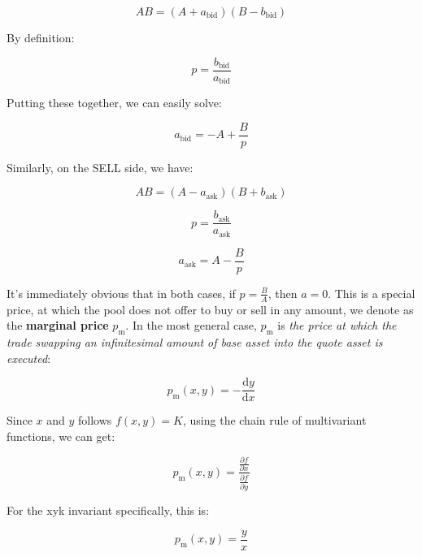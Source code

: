 \documentclass{article}
\begin{document}
\begin{equation}
  A B = (A + a_{\mathrm{bid}}) (B - b_{\mathrm{bid}})
\end{equation}

By definition:

\begin{equation}
  p = \frac{b_{\mathrm{bid}}}{a_{\mathrm{bid}}}
\end{equation}

Putting these together, we can easily solve:

\begin{equation}
  a_{\mathrm{bid}} = -A + \frac{B}{p}
\end{equation}

Similarly, on the SELL side, we have:

\begin{equation}
  A B = (A - a_{\mathrm{ask}}) (B + b_{\mathrm{ask}})
\end{equation}

\begin{equation}
  p = \frac{b_{\mathrm{ask}}}{a_{\mathrm{ask}}}
\end{equation}

\begin{equation}
  a_{\mathrm{ask}} = A - \frac{B}{p}
\end{equation}

It's immediately obvious that in both cases, if $p = \frac{B}{A}$, then $a = 0$. This is a special price, at which the pool does not offer to buy or sell in any amount, we denote as the \textbf{marginal price} $p_{\mathrm{m}}$. In the most general case, $p_{\mathrm{m}}$ is \textit{the price at which the trade swapping an infinitesimal amount of base asset into the quote asset is executed}:

\begin{equation}
  p_{\mathrm{m}}(x, y) = - \frac{\mathrm{d}y}{\mathrm{d}x}
\end{equation}

Since $x$ and $y$ follows $f(x, y) = K$, using the chain rule of multivariant functions, we can get:

\begin{equation}
  p_{\mathrm{m}}(x, y) = \frac{\frac{\partial f}{\partial x}}{\frac{\partial f}{\partial y}}
\end{equation}

For the xyk invariant specifically, this is:

\begin{equation}
  p_{\mathrm{m}}(x, y) = \frac{y}{x}
\end{equation}
\end{document}
